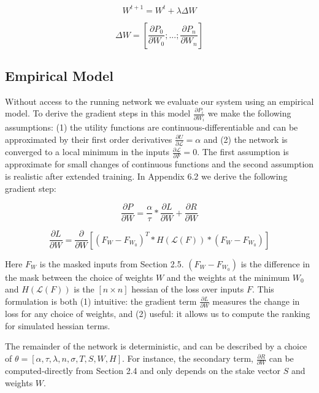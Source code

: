 \documentclass{article}
\begin{document}
\begin{equation}
W^{t+1} = W^{t} + \lambda \Delta W 
\end{equation}
\smallskip


\begin{equation}
\Delta W = [\frac{\partial P_0}{\partial W_0} ; ... ;\frac{\partial P_n}{\partial W_n}]
\end{equation}
\smallskip

\subsection{Empirical Model}

Without access to the running network we evaluate our system using an empirical model. To derive the gradient steps in this model $\frac{\partial P_i}{\partial W_i}$ we make the following assumptions: (1) the utility functions are continuous-differentiable and can be approximated by their first order derivatives $\frac{\partial U}{\partial \mathcal{L}} = \alpha$ and (2) the network is converged to a local minimum in the inputs $\frac{\partial\mathcal{L}}{\partial F} = 0$. The first assumption is approximate for small changes of continuous functions and the second assumption is realistic after extended training. In Appendix 6.2 we derive the following gradient step:
\smallskip

\begin{equation}
\frac{\partial P}{\partial W} = \frac{\alpha}{\tau} * \frac{\partial L}{\partial W} + \frac{\partial R}{\partial W}
\end{equation}
\smallskip


\begin{equation}
\frac{\partial L}{\partial W} = \frac{\partial}{\partial W} [(F_W - F_{W_0})^T * H( \mathcal{L}(F)) * (F_W - F_{W_0})] 
\end{equation}
\smallskip

Here $F_W$ is the masked inputs from Section 2.5. $(F_W - F_{W_0})$ is the difference in the mask between the choice of weights $W$ and the weights at the minimum $W_0$ and $H( \mathcal{L}(F))$ is the $[n \times n]$ hessian of the loss over inputs $F$. This formulation is both  (1) intuitive: the gradient term $\frac{\partial L}{\partial W}$ measures the change in loss for any choice of weights, and (2) useful: it allows us to compute the ranking for simulated hessian terms.
\smallskip

The remainder of the network is deterministic, and can be described by a choice of $\theta = [\alpha, \tau, \lambda, n, \sigma, T, S, W, H]$. For instance, the secondary term, $\frac{\partial R}{\partial W}$ can be computed-directly from Section 2.4 and only depends on the stake vector $S$ and weights $W$.
\smallskip
\end{document}
